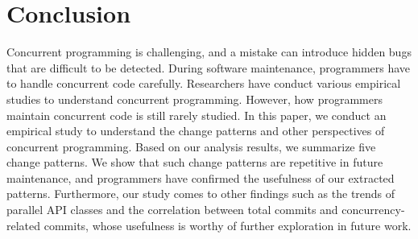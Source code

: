 \section{Conclusion}
Concurrent programming is challenging, and a mistake can introduce hidden bugs that are difficult to be detected. During software maintenance, programmers have to handle concurrent code carefully. Researchers have conduct various empirical studies to understand concurrent programming. However, how programmers maintain concurrent code is still rarely studied. In this paper, we conduct an empirical study to understand the change patterns and other perspectives of concurrent programming. Based on our analysis results, we summarize five change patterns. We show that such change patterns are repetitive in future maintenance, and programmers have confirmed the usefulness of our extracted patterns. Furthermore, our study comes to other findings such as the trends of parallel API classes and the correlation between total commits and concurrency-related commits, whose usefulness is worthy of further exploration in future work. 
